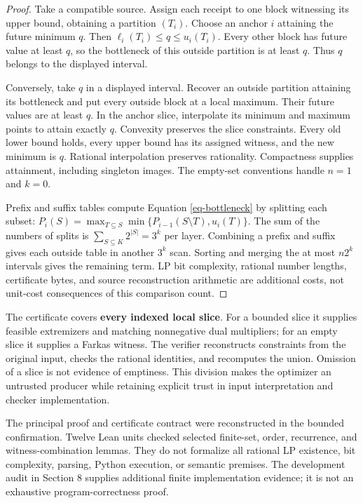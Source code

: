 \documentclass{article}
\theoremstyle{definition}
\begin{document}
\begin{proof}

Take a compatible source. Assign each receipt to one block witnessing
its upper bound, obtaining a partition \((T_i)\). Choose an anchor \(i\)
attaining the future minimum \(q\). Then
\(\ell_i(T_i)\leq q\leq u_i(T_i)\). Every other block has future value
at least \(q\), so the bottleneck of this outside partition is at least
\(q\). Thus \(q\) belongs to the displayed interval.

Conversely, take \(q\) in a displayed interval. Recover an outside
partition attaining its bottleneck and put every outside block at a
local maximum. Their future values are at least \(q\). In the anchor
slice, interpolate its minimum and maximum points to attain exactly
\(q\). Convexity preserves the slice constraints. Every old lower bound
holds, every upper bound has its assigned witness, and the new minimum
is \(q\). Rational interpolation preserves rationality. Compactness
supplies attainment, including singleton images. The empty-set
conventions handle \(n=1\) and \(k=0\).

Prefix and suffix tables compute Equation \ref{eq-bottleneck} by
splitting each subset:
\(P_i(S)=\max_{T\subseteq S}\min\{P_{i-1}(S\setminus T),u_i(T)\}\). The
sum of the numbers of splits is \(\sum_{S\subseteq K}2^{|S|}=3^k\) per
layer. Combining a prefix and suffix gives each outside table in another
\(3^k\) scan. Sorting and merging the at most \(n2^k\) intervals gives
the remaining term. LP bit complexity, rational number lengths,
certificate bytes, and source reconstruction arithmetic are additional
costs, not unit-cost consequences of this comparison count.
\end{proof}

The certificate covers \textbf{every indexed local slice}. For a bounded
slice it supplies feasible extremizers and matching nonnegative dual
multipliers; for an empty slice it supplies a Farkas witness. The
verifier reconstructs constraints from the original input, checks the
rational identities, and recomputes the union. Omission of a slice is
not evidence of emptiness. This division makes the optimizer an
untrusted producer while retaining explicit trust in input
interpretation and checker implementation.

The principal proof and certificate contract were reconstructed in the
bounded confirmation. Twelve Lean units checked selected finite-set,
order, recurrence, and witness-combination lemmas. They do not formalize
all rational LP existence, bit complexity, parsing, Python execution, or
semantic premises. The development audit in Section 8 supplies
additional finite implementation evidence; it is not an exhaustive
program-correctness proof.
\end{document}
